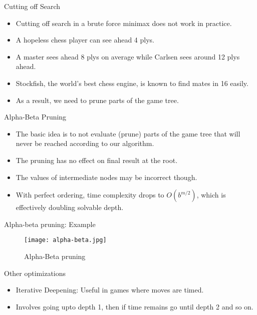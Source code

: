 \documentclass{beamer}
\begin{document}
\begin{frame}{Cutting off Search}
  \begin{itemize}
    \item Cutting off search in a brute force minimax does not work in practice.
    \item A hopeless chess player can see ahead 4 plys.
    \item A master sees ahead 8 plys on average while Carlsen sees around 12 plys ahead.
    \item Stockfish, the world's best chess engine, is known to find mates in 16 easily.
    \item As a result, we need to prune parts of the game tree.
  \end{itemize}
\end{frame}

\begin{frame}{Alpha-Beta Pruning}
  \begin{itemize}
    \item The basic idea is to not evaluate (prune) parts of the game tree that will never be reached according to our algorithm.
    \item The pruning has no effect on final result at the root.
    \item The values of intermediate nodes may be incorrect though.
    \item With perfect ordering, time complexity drops to \(O(b^{m/2})\), which is effectively doubling solvable depth.
  \end{itemize}
\end{frame}

\begin{frame}{Alpha-beta pruning: Example}
  \begin{figure}[htbp]
    \centering
    \texttt{[image: alpha-beta.jpg]}
    \caption{Alpha-Beta pruning}
  \end{figure}
\end{frame}


\begin{frame}{Other optimizations}
  \begin{itemize}
    \item Iterative Deepening: Useful in games where moves are timed.
    \item Involves going upto depth 1, then if time remains go until depth 2 and so on.
  \end{itemize}
\end{frame}
\end{document}
